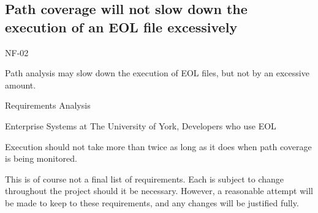 \subsection{Path coverage will not slow down the execution of an EOL file excessively}
\begin{description}[style=sameline,leftmargin=4.5cm,nolistsep]
\item[\hspace*{0.3cm}Label] NF-02
\item[\hspace*{0.3cm}Description] Path analysis may slow down the execution of EOL files, but not by an excessive amount.
\item[\hspace*{0.3cm}Source] Requirements Analysis
\item[\hspace*{0.3cm}Stakeholders] Enterprise Systems at The University of York, Developers who use EOL
\item[\hspace*{0.3cm}Satisfiable Conditions] Execution should not take more than twice as long as it does when path coverage is being monitored.
\end{description}

This is of course not a final list of requirements. Each is subject to change throughout the project should it be necessary. However, a reasonable attempt will be made to keep to these requirements, and any changes will be justified fully.